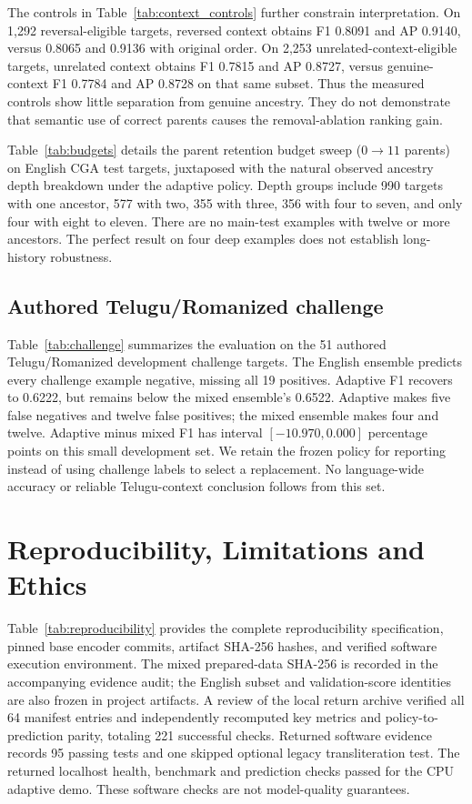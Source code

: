 \documentclass[11pt,a4paper]{article}
\begin{document}
The controls in Table~\ref{tab:context_controls} further constrain interpretation. On 1,292 reversal-eligible targets, reversed context obtains F1 0.8091 and AP 0.9140, versus 0.8065 and 0.9136 with original order. On 2,253 unrelated-context-eligible targets, unrelated context obtains F1 0.7815 and AP 0.8727, versus genuine-context F1 0.7784 and AP 0.8728 on that same subset. Thus the measured controls show little separation from genuine ancestry. They do not demonstrate that semantic use of correct parents causes the removal-ablation ranking gain.

Table~\ref{tab:budgets} details the parent retention budget sweep ($0 \to 11$ parents) on English CGA test targets, juxtaposed with the natural observed ancestry depth breakdown under the adaptive policy. Depth groups include 990 targets with one ancestor, 577 with two, 355 with three, 356 with four to seven, and only four with eight to eleven. There are no main-test examples with twelve or more ancestors. The perfect result on four deep examples does not establish long-history robustness.

\subsection{Authored Telugu/Romanized challenge}
Table~\ref{tab:challenge} summarizes the evaluation on the 51 authored Telugu/Romanized development challenge targets. The English ensemble predicts every challenge example negative, missing all 19 positives. Adaptive F1 recovers to 0.6222, but remains below the mixed ensemble's 0.6522. Adaptive makes five false negatives and twelve false positives; the mixed ensemble makes four and twelve. Adaptive minus mixed F1 has interval $[-10.970,0.000]$ percentage points on this small development set. We retain the frozen policy for reporting instead of using challenge labels to select a replacement. No language-wide accuracy or reliable Telugu-context conclusion follows from this set.

\section{Reproducibility, Limitations and Ethics}
Table~\ref{tab:reproducibility} provides the complete reproducibility specification, pinned base encoder commits, artifact SHA-256 hashes, and verified software execution environment. The mixed prepared-data SHA-256 is recorded in the accompanying evidence audit; the English subset and validation-score identities are also frozen in project artifacts. A review of the local return archive verified all 64 manifest entries and independently recomputed key metrics and policy-to-prediction parity, totaling 221 successful checks. Returned software evidence records 95 passing tests and one skipped optional legacy transliteration test. The returned localhost health, benchmark and prediction checks passed for the CPU adaptive demo. These software checks are not model-quality guarantees.
\end{document}
